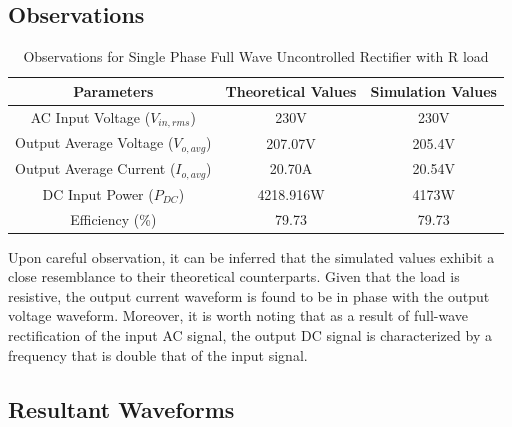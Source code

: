 \subsection{Observations}

\begin{table}[h]
    \renewcommand{\arraystretch}{1.3}
    \label{table_observation_circuit_1}
    \centering
    \begin{tabular}{|c|c|c|}
        \hline
        Parameters                              & Theoretical Values & Simulation Values \\
        \hline
        \hline
        AC Input Voltage ($ V_{in,rms} $)       & 230V               & 230V              \\
        \hline
        Output Average Voltage ($ V_{o,avg} $)  & 207.07V            & 205.4V            \\
        \hline
        Output Average Current ($ I_{o,avg}  $) & 20.70A             & 20.54V            \\
        \hline
        DC Input Power ($ P_{DC}  $)            & 4218.916W          & 4173W             \\
        \hline
        Efficiency (\%)                         & 79.73              & 79.73             \\
        \hline
    \end{tabular}
    \caption{Observations for Single Phase Full Wave Uncontrolled Rectifier with R load}

\end{table}


Upon careful observation, it can be inferred that the simulated values exhibit a close resemblance to their theoretical counterparts. Given that the load is resistive, the output current waveform is found to be in phase with the output voltage waveform. Moreover, it is worth noting that as a result of full-wave rectification of the input AC signal, the output DC signal is characterized by a frequency that is double that of the input signal.
\pagebreak

\subsection{Resultant Waveforms}

